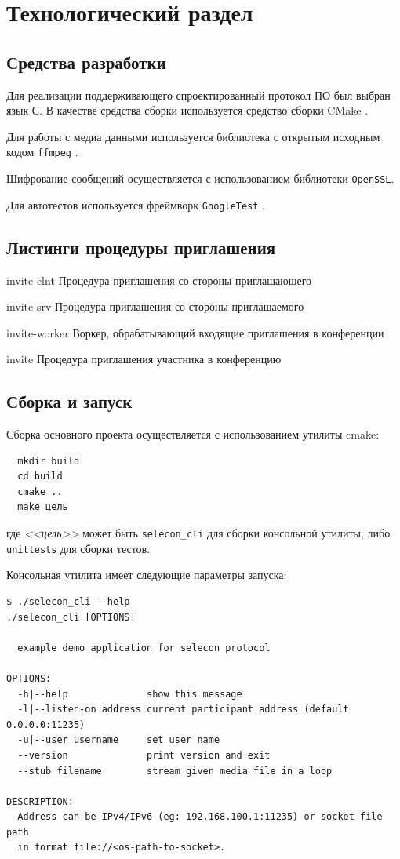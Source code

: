 \chapter{Технологический раздел}

\section{Средства разработки}

Для реализации поддерживающего спроектированный протокол ПО был выбран язык С.
В качестве средства сборки используется средство сборки CMake \cite{cmake}.

Для работы с медиа данными используется библиотека с открытым исходным кодом \texttt{ffmpeg} \cite{ffmpeg}.

Шифрование сообщений осуществляется с использованием библиотеки \texttt{OpenSSL}.

Для автотестов используется фреймворк \texttt{GoogleTest} \cite{gtest}.

\section{Листинги процедуры приглашения}

  {invite-clnt}
  {Процедура приглашения со стороны приглашающего}

  {invite-srv}
  {Процедура приглашения со стороны приглашаемого}

  {invite-worker}
  {Воркер, обрабатывающий входящие приглашения в конференции}

  {invite}
  {Процедура приглашения участника в конференцию}

\section{Сборка и запуск}

Сборка основного проекта осуществляется с использованием утилиты cmake:

\begin{verbatim}
  mkdir build
  cd build
  cmake ..
  make цель
\end{verbatim}
где \textit{<<цель>>} может быть \texttt{selecon\_cli} для сборки консольной утилиты, либо \texttt{unittests} для сборки тестов.

Консольная утилита имеет следующие параметры запуска:

\begin{verbatim}
$ ./selecon_cli --help
./selecon_cli [OPTIONS]

  example demo application for selecon protocol

OPTIONS:
  -h|--help              show this message
  -l|--listen-on address current participant address (default 0.0.0.0:11235)
  -u|--user username     set user name
  --version              print version and exit
  --stub filename        stream given media file in a loop

DESCRIPTION:
  Address can be IPv4/IPv6 (eg: 192.168.100.1:11235) or socket file path
  in format file://<os-path-to-socket>.
\end{verbatim}

